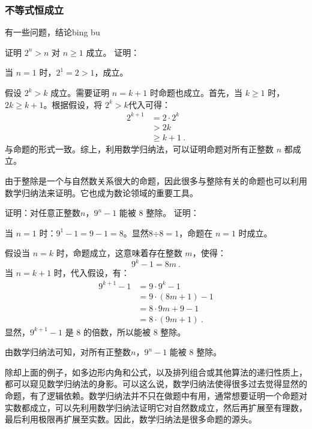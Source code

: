 \subsubsection{不等式恒成立}
有一些问题，结论bing bu
\begin{example}{证明 $2^n > n$ 对 $n \geq 1$ 成立。}
证明：

当 $n = 1$ 时，$2^1 = 2 > 1$，成立。

假设 $2^k > k$ 成立。需要证明 $n = k+1$ 时命题也成立。首先，当 $k \geq 1$ 时，$2k \geq k+1$。根据假设，将 $2^k > k$代入可得：
\begin{equation}
\begin{aligned}
2^{k+1} &= 2 \cdot 2^k\\
&> 2k\\
&\geq k+1~.
\end{aligned}
\end{equation}
与命题的形式一致。综上，利用数学归纳法，可以证明命题对所有正整数 $n$ 都成立。
\end{example}
由于整除是一个与自然数关系很大的命题，因此很多与整除有关的命题也可以利用数学归纳法来证明。它也成为数论领域的重要工具。
\begin{example}{证明：对任意正整数$n$，$9^{n} - 1$ 能被 $8$ 整除。}
证明：

当 $n = 1$ 时：$9^1 - 1 = 9 - 1 = 8$。显然$8\text{÷}8=1$，命题在 $n = 1$ 时成立。

假设当 $n = k$ 时，命题成立，这意味着存在整数 $m$，使得：
\begin{equation}
9^k - 1 = 8m~.
\end{equation}
当 $n = k+1$ 时，代入假设，有：
\begin{equation}
\begin{aligned}
9^{k+1} - 1 &= 9\cdot9^{k} - 1\\
&= 9\cdot(8m+1)- 1\\
&= 8\cdot9m+9- 1\\
&= 8\cdot(9m+1)~.
\end{aligned}
\end{equation}
显然，$9^{k+1} - 1$ 是 $8$ 的倍数，所以能被 $8$ 整除。

由数学归纳法可知，对所有正整数$n$，$9^{n} - 1$ 能被 $8$ 整除。
\end{example}
除却上面的例子，如多边形内角和公式，以及排列组合或其他算法的递归性质上，都可以窥见数学归纳法的身影。可以这么说，数学归纳法使得很多过去觉得显然的命题，有了逻辑依赖。数学归纳法并不只在做题中有用，通常想要证明一个命题对实数都成立，可以先利用数学归纳法证明它对自然数成立，然后再扩展至有理数，最后利用极限再扩展至实数。因此，数学归纳法是很多命题的源头。

